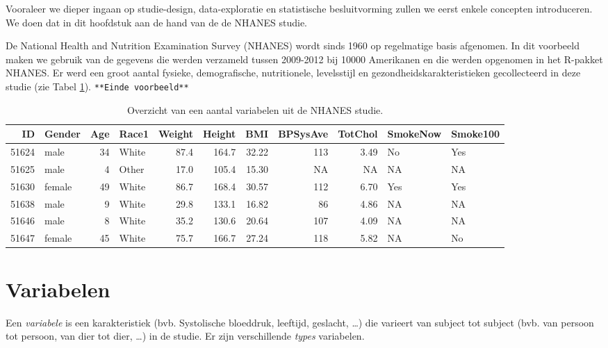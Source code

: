 \documentclass[12pt,dutch,coursenotes]{book}
\theoremstyle{definition}
\theoremstyle{definition}
\theoremstyle{definition}
\theoremstyle{remark}
\let\BeginKnitrBlock\begin \let\EndKnitrBlock\end
\begin{document}
Vooraleer we dieper ingaan op studie-design, data-exploratie en
statistische besluitvorming zullen we eerst enkele concepten
introduceren. We doen dat in dit hoofdstuk aan de hand van de de NHANES
studie.

\BeginKnitrBlock{example}[NHANES studie]
\protect\hypertarget{exm:nhanesEx}{}{\label{exm:nhanesEx} \iffalse (NHANES
studie) \fi{} }
\EndKnitrBlock{example}

De National Health and Nutrition Examination Survey (NHANES) wordt sinds
1960 op regelmatige basis afgenomen. In dit voorbeeld maken we gebruik
van de gegevens die werden verzameld tussen 2009-2012 bij 10000
Amerikanen en die werden opgenomen in het R-pakket NHANES. Er werd een
groot aantal fysieke, demografische, nutritionele, levelsstijl en
gezondheidskarakteristieken gecollecteerd in deze studie (zie Tabel
\ref{tab:nhanes}). \texttt{**Einde\ voorbeeld**}

\begin{table}

\caption{\label{tab:nhanes}Overzicht van een aantal variabelen uit de NHANES studie.}
\centering
\begin{tabular}[t]{rlrlrrrrrll}
\toprule
ID & Gender & Age & Race1 & Weight & Height & BMI & BPSysAve & TotChol & SmokeNow & Smoke100\\
\midrule
51624 & male & 34 & White & 87.4 & 164.7 & 32.22 & 113 & 3.49 & No & Yes\\
51625 & male & 4 & Other & 17.0 & 105.4 & 15.30 & NA & NA & NA & NA\\
51630 & female & 49 & White & 86.7 & 168.4 & 30.57 & 112 & 6.70 & Yes & Yes\\
51638 & male & 9 & White & 29.8 & 133.1 & 16.82 & 86 & 4.86 & NA & NA\\
51646 & male & 8 & White & 35.2 & 130.6 & 20.64 & 107 & 4.09 & NA & NA\\
51647 & female & 45 & White & 75.7 & 166.7 & 27.24 & 118 & 5.82 & NA & No\\
\bottomrule
\end{tabular}
\end{table}

\section{Variabelen}\label{variabelen}

Een \emph{variabele} is een karakteristiek (bvb. Systolische bloeddruk,
leeftijd, geslacht, \ldots{}) die varieert van subject tot subject (bvb.
van persoon tot persoon, van dier tot dier, \ldots{}) in de studie. Er
zijn verschillende \emph{types} variabelen.
\end{document}
